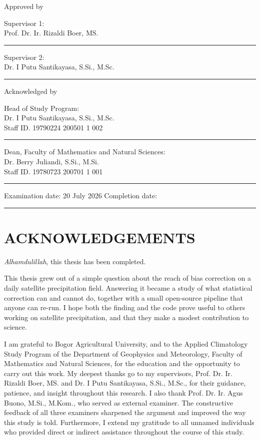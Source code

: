 \vspace{3cm}
\begin{center}Approved by\end{center}

\noindent Supervisor 1:\\
Prof. Dr. Ir. Rizaldi Boer, MS. \hfill \rule{4cm}{0.4pt}

\vspace{1cm}
\noindent Supervisor 2:\\
Dr. I Putu Santikayasa, S.Si., M.Sc. \hfill \rule{4cm}{0.4pt}

\vspace{2cm}
\begin{center}Acknowledged by\end{center}

\noindent Head of Study Program:\\
Dr. I Putu Santikayasa, S.Si., M.Sc.\\
Staff ID. 19790224 200501 1 002 \hfill \rule{4cm}{0.4pt}

\vspace{1cm}
\noindent Dean, Faculty of Mathematics and Natural Sciences:\\
Dr. Berry Juliandi, S.Si., M.Si.\\
Staff ID. 19780723 200701 1 001 \hfill \rule{4cm}{0.4pt}

\vspace{5cm}
\noindent Examination date: 20 July 2026 \hfill
Completion date: \rule{3cm}{0.4pt}
\clearpage

\thispagestyle{empty}\null\clearpage

\chapter*{ACKNOWLEDGEMENTS}\thispagestyle{empty}
\textit{Alhamdulillah}, this thesis has been completed.

This thesis grew out of a simple question about the reach of bias
correction on a daily satellite precipitation field. Answering it became a
study of what statistical correction can and cannot do, together with a
small open-source pipeline that anyone can re-run. I hope both the finding
and the code prove useful to others working on satellite precipitation,
and that they make a modest contribution to science.

I am grateful to Bogor Agricultural University, and to the Applied
Climatology Study Program of the Department of Geophysics and Meteorology, 
Faculty of Mathematics and Natural Sciences, for the education and 
the opportunity to carry out this work. My deepest thanks go to my supervisors, 
Prof. Dr. Ir. Rizaldi Boer, MS. and Dr. I Putu Santikayasa, S.Si., M.Sc., 
for their guidance, patience, and insight throughout this research. 
I also thank Prof. Dr. Ir. Agus Buono, M.Si., M.Kom., who served as external 
examiner. The constructive feedback of all three examiners sharpened the 
argument and improved the way this study is told. Furthermore, I extend 
my gratitude to all unnamed individuals who provided direct or indirect 
assistance throughout the course of this study.

